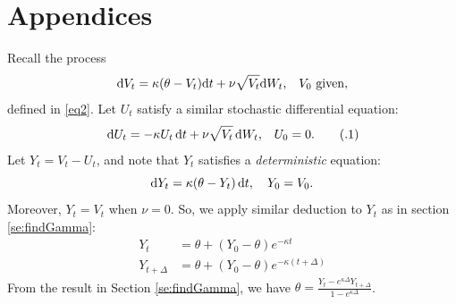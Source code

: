 \documentclass{ws-ijfe}
\newcommand\numberthis{\addtocounter{equation}{1}\tag{\theequation}}
\begin{document}

\appendix

\section{Appendices}
\label{sec:AppendixA}
Recall the process
\begin{equation*}
  \mathrm{d} V_t = \kappa(\theta-V_t)\mathrm{d} t +\nu\sqrt{V_t}\mathrm{d} W_t\text{,} \quad V_0 \text{ given},
\end{equation*}
defined in \eqref{eq2}.
Let $U_t$ satisfy a similar stochastic differential equation:
\begin{equation*}
  \,\d U_t = -\kappa U_t\,\d t + \nu\sqrt{V_t}\,\d W_t\text{,} \quad U_0 = 0.\numberthis\label{appeqnV_t}
\end{equation*}
Let $Y_t=V_t-U_t$, and note that $Y_t$ satisfies a \emph{deterministic} equation:
\begin{equation*}
  \mathrm{d} Y_t = \kappa(\theta-Y_t)\,\mathrm{d} t, \quad Y_0 = V_0.
\end{equation*}
Moreover, $Y_t=V_t$ when $\nu = 0$. So, we apply similar deduction to $Y_t$ as in section \ref{se:findGamma}:
\begin{align*}
Y_t &=\theta+(Y_0-\theta)e^{-\kappa t}\\
Y_{t+\Delta} &=\theta+(Y_0-\theta)e^{-\kappa (t+\Delta)}
\end{align*}
From the result in Section \ref{se:findGamma}, we have $\theta=\frac{Y_t-e^{\kappa\Delta}Y_{t+\Delta}}{1-e^{\kappa\Delta}}$.
\end{document}
